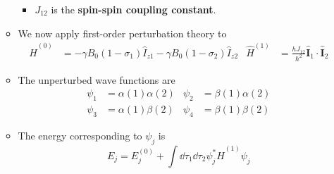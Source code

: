 \documentclass[../notes.tex]{subfiles}
\begin{document}
\begin{itemize}
\begin{itemize}
\begin{itemize}
            \item $J_{12}$ is the \textbf{spin-spin coupling constant}.
        \end{itemize}
        \item We now apply first-order perturbation theory to
        \begin{align*}
            \hat{H}^{(0)} &= -\gamma B_0(1-\sigma_1)\hat{I}_{z1}-\gamma B_0(1-\sigma_2)\hat{I}_{z2}&
            \hat{H}^{(1)} &= \frac{hJ_{12}}{\hbar^2}\hat{\mathbf{I}}_1\cdot\hat{\mathbf{I}}_2
        \end{align*}
        \item The unperturbed wave functions are
        \begin{align*}
            \psi_1 &= \alpha(1)\alpha(2)&
                \psi_2 &= \beta(1)\alpha(2)\\
            \psi_3 &= \alpha(1)\beta(2)&
                \psi_4 &= \beta(1)\beta(2)
        \end{align*}
        \item The energy corresponding to $\psi_j$ is
        \begin{equation*}
            E_j = E_j^{(0)}+\int\dd{\tau_1}\dd{\tau_2}\psi_j^*\hat{H}^{(1)}\psi_j
        \end{equation*}

\end{itemize}
\end{itemize}
\end{document}
